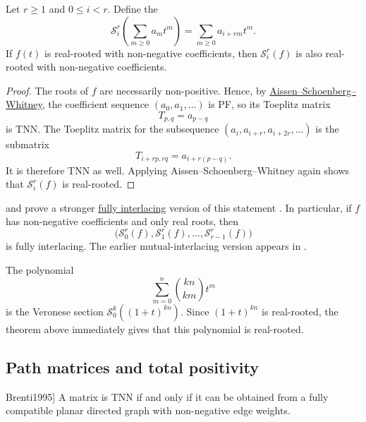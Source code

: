 \begin{theorem}
\label{veroneseSectionsRealRooted}
Let \(r\geq 1\) and \(0\leq i<r\).  Define the 
\[
  \mathcal{S}^r_i\left(\sum_{m\geq 0} a_m t^m\right)
  =
  \sum_{m\geq 0} a_{i+rm} t^m.
\]
If \(f(t)\) is real-rooted with non-negative coefficients, then
\(\mathcal{S}^r_i(f)\) is also real-rooted with non-negative coefficients.
\end{theorem}

\begin{proof}
The roots of \(f\) are necessarily non-positive.  Hence, by
\hyperref[aissenSchoenbergWhitney]{Aissen--Schoenberg--Whitney}, the
coefficient sequence \((a_0,a_1,\dotsc)\) is PF, so its Toeplitz matrix
\[
  T_{p,q}=a_{p-q}
\]
is TNN.  The Toeplitz matrix for the subsequence
\((a_i,a_{i+r},a_{i+2r},\dotsc)\) is the submatrix
\[
  T_{i+rp,rq}=a_{i+r(p-q)}.
\]
It is therefore TNN as well.  Applying Aissen--Schoenberg--Whitney again
shows that \(\mathcal{S}^r_i(f)\) is real-rooted.
\end{proof}

 and  prove a stronger
\hyperref[fullyInterlacingLace]{fully interlacing} version of this statement
\cite[Thm.~5.3 and Rem.~5.4]{AthanasiadisWagner2024x}.  In particular, if
\(f\) has non-negative coefficients and only real roots, then
\[
  \bigl(
    \mathcal{S}^r_0(f),
    \mathcal{S}^r_1(f),
    \dotsc,
    \mathcal{S}^r_{r-1}(f)
  \bigr)
\]
is fully interlacing.  The earlier mutual-interlacing version appears in \cite[Thm.~7.65]{Fisk2006x}.

\begin{example*}
The polynomial
\[
  \sum_{m=0}^{n}\binom{kn}{km}t^m
\]
is the Veronese section \(\mathcal{S}^k_0((1+t)^{kn})\).
Since \((1+t)^{kn}\) is real-rooted, the theorem above immediately gives
that this polynomial is real-rooted.
\end{example*}

\subsection[tnnPathMatrix]{Path matrices and total positivity}

\begin{theorem}[Characterization of TNN matrices, \cite[Thm.~3.1]{Brenti1995}]
\label{brentiTnnPathMatrix}
A matrix is TNN if and only if it can be obtained from a fully compatible
planar directed graph with non-negative edge weights.
\end{theorem}

